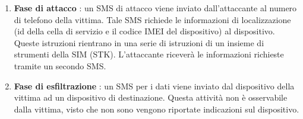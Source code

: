 \begin{enumerate}
    \item \textbf{Fase di attacco} : un SMS di attacco viene inviato dall'attaccante al numero di telefono della vittima. Tale SMS richiede le informazioni di localizzazione (id della cella di servizio e il codice IMEI del dispositivo) al dispositivo. Queste istruzioni rientrano in una serie di istruzioni di un insieme di strumenti della SIM (STK). L'attaccante riceverà le informazioni richieste tramite un secondo SMS.
    \item \textbf{Fase di esfiltrazione} : un SMS per i dati viene inviato dal dispositivo della vittima ad un dispositivo di destinazione. Questa attività non è osservabile dalla vittima, visto che non sono vengono riportate indicazioni sul dispositivo.
\end{enumerate}
